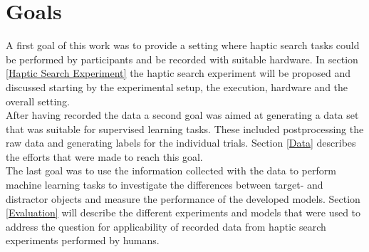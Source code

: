 \section{Goals} \label{Goals}
A first goal of this work was to provide a setting where haptic search tasks could be performed by participants and be recorded with suitable hardware. In section \ref{Haptic Search Experiment} the haptic search experiment will be proposed and discussed starting by the experimental setup, the execution, hardware and the overall setting.\\
After having recorded the data a second goal was aimed at generating a data set that was suitable for supervised learning tasks. These included postprocessing the raw data and generating labels for the individual trials. Section \ref{Data} describes the efforts that were made to reach this goal.\\
The last goal was to use the information collected with the data to perform machine learning tasks to investigate the differences between target- and distractor objects and measure the performance of the developed models. Section \ref{Evaluation} will describe the different experiments and models that were used to address the question for applicability of recorded data from haptic search experiments performed by humans.  
